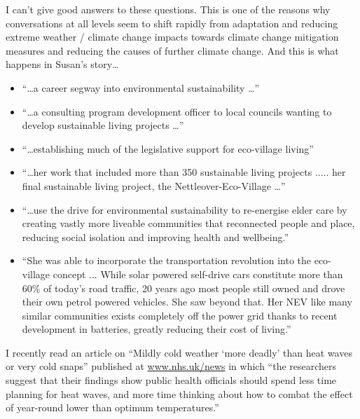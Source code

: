I can't give good answers to these questions. This is one of the reasons why conversations at all levels seem to shift rapidly from adaptation and reducing extreme weather / climate change impacts towards climate change mitigation measures and reducing the causes of further climate change. And this is what happens in Susan's story\ldots
 \begin{itemize}
 \item ``\ldots a career segway into environmental sustainability \ldots''
 \item ``\ldots a consulting program development officer to local councils wanting to develop sustainable living projects \dots''
 \item ``\ldots establishing much of the legislative support for eco-village living''
 \item ``\ldots her work that included more than 350 sustainable living projects ..... her final sustainable living project, the Nettleover-Eco-Village \dots''
 \item ``\ldots use the drive for environmental sustainability to re-energise elder care by creating vastly more liveable communities that reconnected people and place, reducing social isolation and improving health and wellbeing.''
 \item ``She was able to incorporate the transportation revolution into the eco-village concept ... While solar powered self-drive cars constitute more than 60\% of today's road traffic, 20 years ago most people still owned and drove their own petrol powered vehicles. She saw beyond that. Her NEV like many similar communities exists completely off the power grid thanks to recent development in batteries, greatly reducing their cost of living.''
 \end{itemize}

I recently read an article on ``Mildly cold weather `more deadly' than heat waves or very cold snaps'' published at \url{www.nhs.uk/news} in which ``the researchers suggest that their findings show public health officials should spend less time planning for heat waves, and more time thinking about how to combat the effect of year-round lower than optimum temperatures.''

